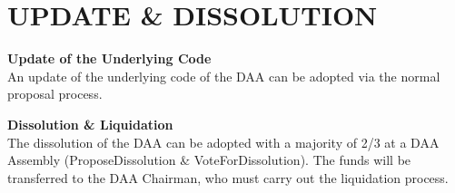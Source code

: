 \section{UPDATE \& DISSOLUTION}

\item \textbf{Update of the Underlying Code} \\
An update of the underlying code of the DAA can be adopted via the normal proposal process.

\item \textbf{Dissolution \& Liquidation} \\
The dissolution of the DAA can be adopted with a majority of 2/3 at a DAA Assembly (ProposeDissolution \& VoteForDissolution). %
The funds will be transferred to the DAA Chairman, who must carry out the liquidation process.
